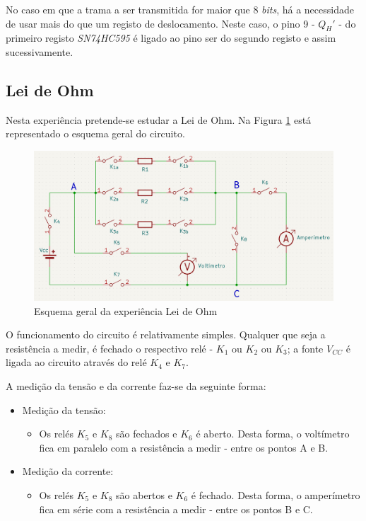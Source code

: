 No caso em que a trama a ser transmitida for maior que 8 \textit{bits}, há a necessidade de usar mais do que um registo de deslocamento. Neste caso, o pino 9 - $Q_{H}'$ - do primeiro registo \textit{SN74HC595} é ligado ao pino \acrshort{ser} do segundo registo e assim sucessivamente.

\subsection{Lei de Ohm}
\label{sec:lei_ohm}
Nesta experiência pretende-se estudar a Lei de Ohm. Na Figura \ref{fig:esq_geral_ohm} está representado o esquema geral do circuito.

\begin{figure}[hbtp]
	\centering
	\includegraphics[width=1\textwidth]{figures/esquema_simplificado_OHM.png}
	\caption{Esquema geral da experiência Lei de Ohm}
	\label{fig:esq_geral_ohm}
\end{figure}

O funcionamento do circuito é relativamente simples. Qualquer que seja a resistência a medir, é fechado o respectivo relé - $K_{1}$ ou $K_{2}$ ou $K_{3}$; a fonte $V_{CC}$ é ligada ao circuito através do relé $K_{4}$ e $K_{7}$.

A medição da tensão e da corrente faz-se da seguinte forma:
\begin{itemize}
	\item Medição da tensão:
	      \begin{itemize}
		      \item Os relés $K_{5}$ e $K_{8}$ são fechados e $K_{6}$ é aberto. Desta forma, o voltímetro fica em paralelo com a resistência a medir - entre os pontos A e B.
	      \end{itemize}
	\item Medição da corrente:
	      \begin{itemize}
		      \item Os relés $K_{5}$ e $K_{8}$ são abertos e $K_{6}$ é fechado. Desta forma, o amperímetro fica em série com a resistência a medir - entre os pontos B e C.
	      \end{itemize}
\end{itemize}

